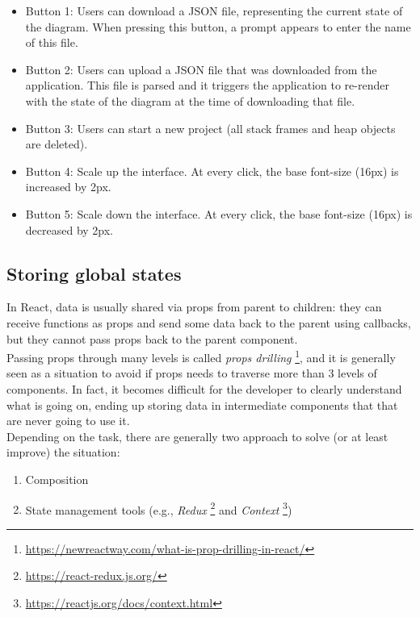 \documentclass[]{usiinfbachelorproject}
\begin{document}
\begin{itemize}
	\item Button 1: Users can download a JSON file, representing the current state of the diagram. When pressing this button, a prompt appears to enter the name of this file.
	\item Button 2: Users can upload a JSON file that was downloaded from the application. This file is parsed and it triggers the application to re-render with the state of the diagram at the time of downloading that file.
	\item Button 3: Users can start a new project (all stack frames and heap objects are deleted).
	\item Button 4: Scale up the interface. At every click, the base font-size (16px) is increased by 2px.
	\item Button 5: Scale down the interface. At every click, the base font-size (16px) is decreased by 2px.
\end{itemize}

\subsection{Storing global states} \label{storing states}

In React, data is usually shared via props from parent to children: they can receive functions as props and send some data back to the parent using callbacks, but they cannot pass props back to the parent component.\\ Passing props through many levels is called \emph{props drilling} \footnote{\url{https://newreactway.com/what-is-prop-drilling-in-react/}}, and it is generally seen as a situation to avoid if props needs to traverse more than 3 levels of components. In fact, it becomes difficult for the developer to clearly understand what is going on, ending up storing data in intermediate components that that are never going to use it.\\

\noindent Depending on the task, there are generally two approach to solve (or at least improve) the situation:

\begin{enumerate}
	\item Composition
	\item State management tools (e.g., \emph{Redux} \footnote{\url{https://react-redux.js.org/}} and \emph{Context} \footnote{\url{https://reactjs.org/docs/context.html}})
\end{enumerate}
\end{document}

